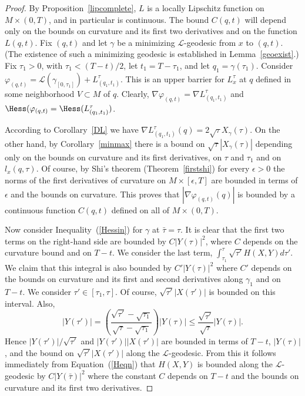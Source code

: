\begin{proof}
By Proposition~\ref{lipcomplete}, $L$ is a locally Lipschitz
function on $M\times (0,T)$, and in particular is continuous. The
bound $C(q,t)$ will depend only on the bounds on curvature and its
first two derivatives and on the function $L(q,t)$. Fix $(q,t)$ and
let $\gamma$ be a minimizing ${\mathcal L}$-geodesic from $x$ to
$(q,t)$. (The existence of such a minimizing geodesic is established
in Lemma~\ref{geoexist}.) Fix $\tau_1>0$, with $\tau_1<(T-t)/2$, let
$t_1=T-\tau_1$, and let $q_1=\gamma(\tau_1)$. Consider
$\varphi_{(q,t)}={\mathcal L}(\gamma_{[0,\tau_1]})+
L^\tau_{(q_1,t_1)}$. This is an upper barrier  for $L_x^\tau$ at $q$
defined in some neighborhood $V\subset M$ of $q$.  Clearly, $\nabla
\varphi_{(q,t)}=\nabla L^\tau_{(q_1,t_1)}$ and $\Hess(\varphi_{(q,t)}=\Hess( L^\tau_{(q_1,t_1)})$.



According to Corollary~\ref{DL} we have $\nabla
L^\tau_{(q_1,t_1)}(q)=2\sqrt{\tau}X_{\gamma}(\tau)$. On the other
hand, by Corollary~\ref{minmax} there is a bound on
$\sqrt{\tau}|X_{\gamma}(\tau)|$ depending only on the bounds on
curvature and its first derivatives, on $\tau$ and $\tau_1$ and on
$l_x(q,\tau)$. Of course, by Shi's theorem (Theorem~\ref{firstshi})
for every $\epsilon>0$ the norms of the first derivatives of
curvature on $M\times [\epsilon,T]$ are bounded in terms of
$\epsilon$ and the bounds on curvature.
 This
proves that $|\nabla \varphi_{(q,t)}(q)|$ is bounded by a continuous
function $C(q,t)$ defined on all of $M\times (0,T)$.

 Now consider Inequality~(\ref{Hessin}) for $\gamma$ at $\bar\tau=\tau$.
 It is clear that the first
 two terms on the right-hand side are bounded by $C|Y(\tau)|^2$,
 where $C$ depends on the curvature bound and on $T-t$. We consider
 the last term, $\int_{\tau_1}^{\tau}\sqrt{\tau'}H(X,Y)d\tau'$.
 We claim that this integral is also bounded by $C'|Y(\tau)|^2$
 where $C'$ depends on the bounds on curvature and its first and
 second derivatives along $\gamma_1$ and on $T-t$.
We consider $\tau'\in [\tau_1,\tau]$. Of course,
 $\sqrt{\tau'}|X(\tau')|$ is bounded on this interval. Also,
 $$|Y(\tau')|=\left(\frac{\sqrt{\tau'}-\sqrt{\tau_1}}{\sqrt{\tau}
 -\sqrt{\tau_1}}\right)|Y(\tau)|\le \frac{\sqrt{\tau'}}{\sqrt{\tau}}|Y(\tau)|.$$
Hence $|Y(\tau')|/\sqrt{\tau'}$ and $|Y(\tau')||X(\tau')|$ are
bounded in terms of $T-t$, $|Y(\tau)|$, and the bound on
$\sqrt{\tau'}|X(\tau')|$ along the ${\mathcal L}$-geodesic. From
this it follows immediately from Equation~(\ref{Heqn}) that $H(X,Y)$
is bounded along the ${\mathcal L}$-geodesic  by $C|Y(\bar\tau)|^2$
 where the constant $C$ depends on $T-t$ and the
 bounds on curvature and its first two derivatives.
\end{proof}

